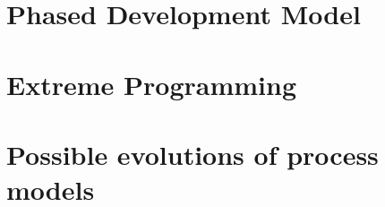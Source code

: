 \documentclass{style/CRPITStyle}
\begin{document}
\section{Phased Development Model} %

\section{Extreme Programming} %

\section{Possible evolutions of process models}




\end{document}
